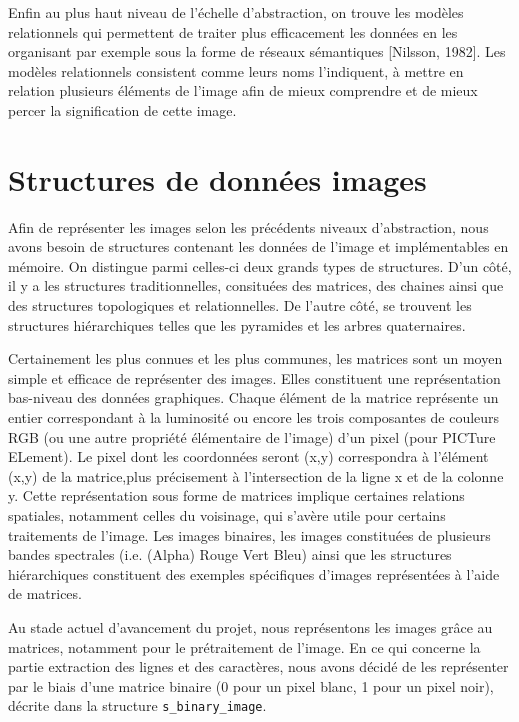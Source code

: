 \documentclass[]{report}
\begin{document}
      Enfin au plus haut niveau de l'échelle d'abstraction, on trouve les modèles relationnels qui permettent de traiter plus efficacement les données en les organisant par exemple sous la forme de réseaux sémantiques [Nilsson, 1982]. Les modèles relationnels consistent comme leurs noms l'indiquent, à mettre en relation plusieurs éléments de l'image afin de mieux comprendre et de mieux percer la signification de cette image.


    \section{Structures de donn\'ees images} %
    \label{sec:structures_de_donn'ees_images}
      Afin de représenter les images selon les précédents niveaux d'abstraction, nous avons besoin de structures contenant les données de l'image et implémentables en mémoire. On distingue parmi celles-ci deux grands types de structures. D'un côté, il y a les structures traditionnelles, consituées des matrices, des chaines ainsi que des structures topologiques et relationnelles. De l'autre côté, se trouvent les structures hiérarchiques telles que les pyramides et les arbres quaternaires.

      Certainement les plus connues et les plus communes, les matrices sont un moyen simple et efficace de représenter des images. Elles constituent une représentation bas-niveau des données graphiques. Chaque élément de la matrice représente un entier correspondant à la luminosité ou encore les trois composantes de couleurs RGB (ou une autre propriété élémentaire de l'image) d'un pixel (pour PICTure ELement). Le pixel dont les coordonnées seront (x,y) correspondra à l'élément (x,y) de la matrice,plus précisement à l'intersection de la ligne x et de la colonne y. Cette représentation sous forme de matrices implique certaines relations spatiales, notamment celles du voisinage, qui s'avère utile pour certains traitements de l'image. Les images binaires, les images constituées de plusieurs bandes spectrales (i.e. (Alpha) Rouge Vert Bleu) ainsi que les structures hiérarchiques constituent des exemples spécifiques d'images représentées à l'aide de matrices.
  

      Au stade actuel d'avancement du projet, nous représentons les images grâce au matrices, notamment pour le prétraitement de l'image. En ce qui concerne la partie extraction des lignes et des caractères, nous avons décidé de les représenter par le biais d'une matrice binaire (0 pour un pixel blanc, 1 pour un pixel noir), décrite dans la structure \verb!s_binary_image!.
\end{document}
